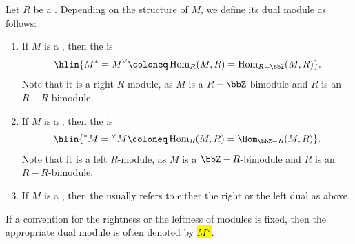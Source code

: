 \begin{definition} \label{definition:dual_of_a_left_right_two_sided_module}
Let $R$ be a . Depending on the  structure of $M$, we define its dual module as follows:
\begin{enumerate}
    \item If $M$ is a , then the  is 
    $$\hlin{M^* = M^\vee \coloneq \operatorname{Hom}_R(M, R) = \operatorname{Hom}_{R-\bbZ}(M, R)}.$$
    Note that it is a right $R$-module, as $M$ is a $R-\bbZ$-bimodule and $R$ is an $R-R$-bimodule. 

    \item If $M$ is a , then the  is 
    $$\hlin{{}^* M = {}^\vee M \coloneq \operatorname{Hom}_R(M, R) = \Hom_{\bbZ-R}(M,R)}.$$
    Note that it is a left $R$-module, as $M$ is a $\bbZ-R$-bimodule and $R$ is an $R-R$-bimodule. 


    \item If $M$ is a , then the  usually refers to either the right or the left dual as above.
\end{enumerate}
If a convention for the rightness or the leftness of modules is fixed, then the appropriate dual module is often denoted by \hl{$M^\vee$}.


\end{definition}
